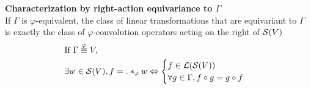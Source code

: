 \begin{proposition}\textbf{Characterization by right-action equivariance to $\Gamma$}\\
If $\Gamma$ is $\varphi$-equivalent, the class of linear transformations that are equivariant to $\Gamma$ is exactly the class of $\varphi$-convolution operators acting on the right of $\mathcal{S}(V)$ \ie
\begin{align*}
& \text{If } \Gamma \overset{\varphi}{\equiv} V,\\
& \exists w \in \mathcal{S}(V), f = . \ast_{\varphi} w \Leftrightarrow
\begin{cases}
f \in \mathcal{L}(\mathcal{S}(V))\\
\forall g \in \Gamma, f \circ g = g \circ f
\end{cases}
\end{align*}
\label{prop:equiG}
\end{proposition}

